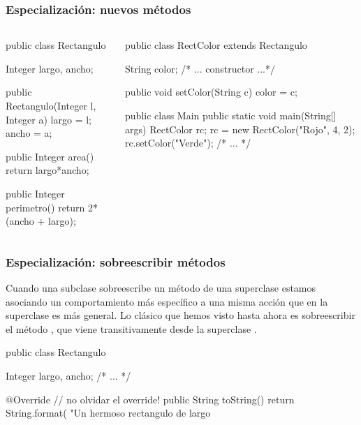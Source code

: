 \documentclass{beamer}
\begin{document}
\begin{frame}[fragile]
  \frametitle{Especialización: nuevos métodos}

     \begin{columns}
       \begin{column}{0.45\textwidth}
         \begin{jsmall}
           public class Rectangulo {
             Integer largo, ancho;

             public Rectangulo(Integer l,
                               Integer a) {
              largo = l;
              ancho = a;                               
             }

             public Integer area() {
               return largo*ancho;
             }

             public Integer perimetro() {
               return 2*(ancho + largo);
             }
           }           
         \end{jsmall}
     \end{column}
    \begin{column}{0.55\textwidth}      
      \begin{jsmall}
        public class RectColor
        extends Rectangulo {
          String color;
          /* ... constructor ...*/

          public void setColor(String c) {
            color = c;
          }
        }

        public class Main {
          public static
          void main(String[] args) {
            RectColor rc;
            rc = new RectColor("Rojo", 4, 2);
            rc.setColor("Verde");
            /* ... */
          }
        }
      \end{jsmall}      
    \end{column}
  \end{columns}  
\end{frame}

\begin{frame}[fragile]
  \frametitle{Especialización: \textbf{sobreescribir} métodos}

  Cuando una subclase sobreescribe un método de una superclase estamos
  asociando un comportamiento más específico a una misma acción que en
  la superclase es más general. Lo clásico que hemos visto hasta ahora
  es sobreescribir el método , que viene
  transitivamente desde la superclase .

  \begin{jsmall}
    public class Rectangulo {
      Integer largo, ancho;
      /* ... */

      @Override // no olvidar el override!
      public String toString() {
        return String.format(
           "Un hermoso rectangulo de largo %
      }
    }    
  \end{jsmall}  
\end{frame}
\end{document}
